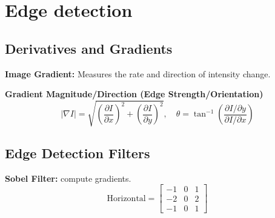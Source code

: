 \section{Edge detection}

\subsection*{Derivatives and Gradients}

\textbf{Image Gradient:} Measures the rate and direction of intensity change. 

\textbf{Gradient Magnitude/Direction (Edge Strength/Orientation)}
\[
|\nabla I| = \sqrt{\left(\frac{\partial I}{\partial x}\right)^2 + \left(\frac{\partial I}{\partial y}\right)^2},
\quad
\theta = \tan^{-1}\left(\frac{\partial I / \partial y}{\partial I / \partial x}\right)
\]


\subsection*{Edge Detection Filters}
\textbf{Sobel Filter:} compute gradients.
\[
\text{Horizontal} = 
\begin{bmatrix}
-1 & 0 & 1 \\
-2 & 0 & 2 \\
-1 & 0 & 1
\end{bmatrix}
\]


